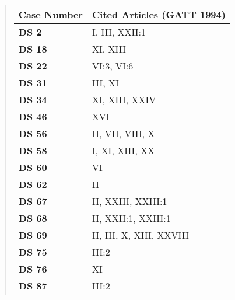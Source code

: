 \begin{quote}
    \setlength\arrayrulewidth{1pt}
    \begin{xltabular}{\linewidth}{ l | X }
        \hline
    
        \textbf{\normalsize Case Number} & \textbf{\normalsize Cited Articles (GATT 1994)}  \\
        \endfirsthead
        \hline \hline
    
        \textbf {DS 2} & I, III, XXII:1 \\ \hline
    
        \textbf {DS 18} & XI, XIII \\ \hline
    
        \textbf {DS 22} & VI:3, VI:6 \\ \hline
    
        \textbf {DS 31} & III, XI \\ \hline
    
        \textbf {DS 34} & XI, XIII, XXIV \\ \hline
    
        \textbf {DS 46} & XVI \\ \hline
    
        \textbf {DS 56} & II, VII, VIII, X \\ \hline
    
        \textbf {DS 58} & I, XI, XIII, XX \\ \hline
    
        \textbf {DS 60} & VI \\ \hline
    
        \textbf {DS 62} & II \\ \hline
    
        \textbf {DS 67} & II, XXIII, XXIII:1 \\ \hline
    
        \textbf {DS 68} & II, XXII:1, XXIII:1 \\ \hline
    
        \textbf {DS 69} & II, III, X, XIII, XXVIII \\ \hline
    
        \textbf {DS 75} & III:2 \\ \hline
    
        \textbf {DS 76} & XI \\ \hline
    
        \textbf {DS 87} & III:2 \\ \hline
    

\end{xltabular}
\end{quote}

